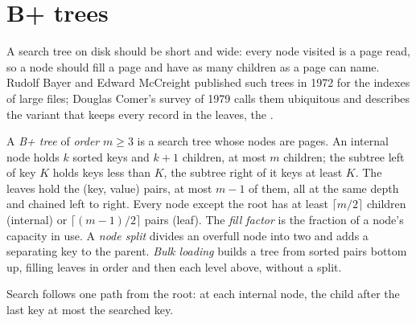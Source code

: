 \label{lst:b3:database-storage:sqlite-header}

\label{out:b3:database-storage:sqlite-header}

\section{B+ trees}\label{sec:b3:database-storage:bptree}

A search tree on disk should be short and wide: every node visited is a page read, so a node should fill a page and have as many children as a page can name. Rudolf Bayer and Edward McCreight published such trees in 1972 for the indexes of large files; Douglas Comer's survey of 1979 calls them ubiquitous and describes the variant that keeps every record in the leaves, the . %

\begin{definition}\label{def:b3:database-storage:bptree}
A \emph{B+ tree} of \emph{order} $m \ge 3$ is a search tree whose nodes are pages. An internal node holds $k$ sorted keys and $k + 1$ children, at most $m$ children; the subtree left of key $K$ holds keys less than $K$, the subtree right of it keys at least $K$. The leaves hold the (key, value) pairs, at most $m - 1$ of them, all at the same depth and chained left to right. Every node except the root has at least $\lceil m/2 \rceil$ children (internal) or $\lceil (m - 1)/2 \rceil$ pairs (leaf). The \emph{fill factor} is the fraction of a node's capacity in use. A \emph{node split} divides an overfull node into two and adds a separating key to the parent. \emph{Bulk loading} builds a tree from sorted pairs bottom up, filling leaves in order and then each level above, without a split.
\end{definition}

Search follows one path from the root: at each internal node, the child after the last key at most the searched key.

\label{lst:b3:database-storage:search}

